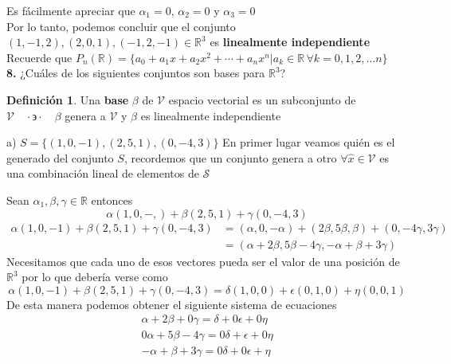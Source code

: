 \documentclass[letterpaper]{article}
\newcommand{\tq}{ \quad \cdot  \backepsilon \cdot \quad }
\newcommand{\R}{\mathds{R}}
\renewcommand{\*}{\cdot}
\theoremstyle{definition}
\newtheorem{definition}{Definición}
\begin{document}
Es fácilmente apreciar que $\alpha_{1}=0$, $\alpha_{2}=0$ y $\alpha_{3}=0$\\

Por lo tanto, podemos concluir que el conjunto $ (1,-1,2), (2,0,1),(-1,2,-1) \in \mathbb{R}^{3}$ es \textbf{linealmente independiente}\\

Recuerde que $P_{n}(\mathbb{R}) = \{ a_0 +  a_1x +  a_2x^2 + \cdots +  a_n x^n \big\vert a_k \in \mathbb{R} \,  \forall k = 0,1,2,\dots n\}$
\\

\noindent \textbf{8.} ¿Cuáles de los siguientes conjuntos son bases para $\mathbb{R}^{3}$?
	\begin{definition}
		Una \textbf{base} $ \beta $ de $ \mathcal{V} $ espacio vectorial es un subconjunto de $ \mathcal{V} \tq \beta$  genera a $ \mathcal{V} $ y $ \beta $ es linealmente independiente
	\end{definition}

	a)  $S = \lbrace (1,0,-1),(2,5,1),(0,-4,3) \rbrace$
	En primer lugar veamos quién es el generado del conjunto $ S $, recordemos que un conjunto genera a otro $ \forall \hat{x} \in \mathcal{V} $ es una combinación lineal de elementos de $ \mathcal{S} $ 
	
	Sean $ \alpha_1, \beta, \gamma \in \R $ entonces
	\[ \alpha(1,0,-,) + \beta(2,5,1) + \gamma(0,-4,3)  \]
	\begin{align*}
		\alpha(1,0,-1)+ \beta(2,5,1)+ \gamma(0,-4,3) & = (\alpha,0,-\alpha) + (2\beta,5\beta,\beta) + (0,-4\gamma,3\gamma)\\
		& = (\alpha + 2\beta ,5\beta -4\gamma,-\alpha + \beta +3\gamma)
	\end{align*}
	Necesitamos que cada uno de esos vectores pueda ser el valor de una posición de $ \R^3 $ por lo que debería verse como \[ 	\alpha(1,0,-1)+ \beta(2,5,1)+ \gamma(0,-4,3) = \delta(1,0,0) + \epsilon(0,1,0) + \eta(0,0,1) \] De esta manera podemos obtener el siguiente sistema de ecuaciones
	\begin{align*}
		\alpha + 2\beta + 0\gamma = \delta + 0\epsilon + 0\eta\\
		0\alpha + 5\beta -4\gamma = 0\delta + \epsilon + 0\eta\\
		-\alpha + \beta +3\gamma = 0\delta +0\epsilon + \eta
	\end{align*}
	
\end{document}
